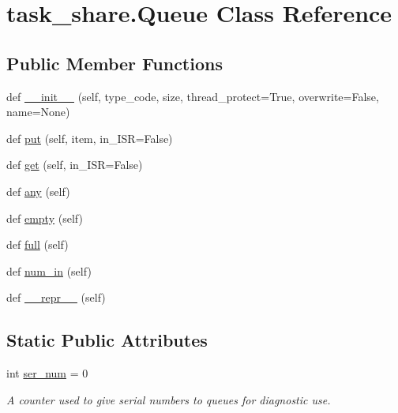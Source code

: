 \hypertarget{classtask__share_1_1_queue}{}\section{task\+\_\+share.\+Queue Class Reference}
\label{classtask__share_1_1_queue}
\subsection*{Public Member Functions}
\begin{DoxyCompactItemize}
\item 
def \mbox{\hyperlink{classtask__share_1_1_queue_a91ce05bf47c2634013fdb2689c2b207f}{\+\_\+\+\_\+init\+\_\+\+\_\+}} (self, type\+\_\+code, size, thread\+\_\+protect=True, overwrite=False, name=None)
\item 
def \mbox{\hyperlink{classtask__share_1_1_queue_ae785bdf9d397d61729c22656471a81df}{put}} (self, item, in\+\_\+\+I\+SR=False)
\item 
def \mbox{\hyperlink{classtask__share_1_1_queue_af2aef1dd3eed21c4b6c2e601cb8497d4}{get}} (self, in\+\_\+\+I\+SR=False)
\item 
def \mbox{\hyperlink{classtask__share_1_1_queue_a7cb2d23978b90a232cf9cea4cc0ccb6b}{any}} (self)
\item 
def \mbox{\hyperlink{classtask__share_1_1_queue_af9ada059fc09a44adc9084901e2f7266}{empty}} (self)
\item 
def \mbox{\hyperlink{classtask__share_1_1_queue_a0482d70ce6405fd8d85628b5cf95d471}{full}} (self)
\item 
def \mbox{\hyperlink{classtask__share_1_1_queue_a713321bacac5d93ecf89c4be1c15fe30}{num\+\_\+in}} (self)
\item 
def \mbox{\hyperlink{classtask__share_1_1_queue_a94d0801557844c8f7dcb772ca768a1a4}{\+\_\+\+\_\+repr\+\_\+\+\_\+}} (self)
\end{DoxyCompactItemize}
\subsection*{Static Public Attributes}
\begin{DoxyCompactItemize}
\item 
int \mbox{\hyperlink{classtask__share_1_1_queue_a6f9d87b116eb16dba0867d3746af9f5f}{ser\+\_\+num}} = 0
\begin{DoxyCompactList}\small\item\em A counter used to give serial numbers to queues for diagnostic use. \end{DoxyCompactList}\end{DoxyCompactItemize}


